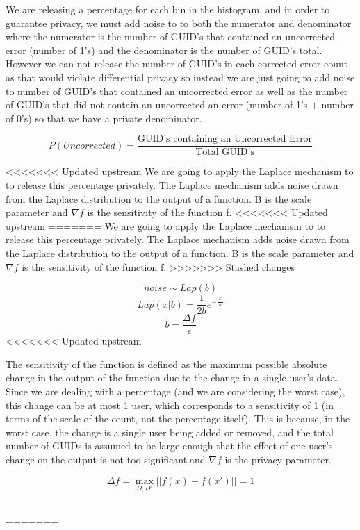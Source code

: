 \documentclass[12pt,letterpaper]{article}
\begin{document}
\begin{table}[h]
We are releasing a percentage for each bin in the histogram, and in order to guarantee privacy, we must add noise to to both the numerator and denominator where the numerator is the number of GUID's that contained an uncorrected error (number of 1's) and the denominator is the number of GUID's total. However we can not release the number of GUID's in each corrected error count as that would violate differential privacy so instead we are just going to add noise to number of GUID's that contained an uncorrected error as well as the number of GUID's that did not contain an uncorrected an error (number of 1's + number of 0's) so that we have a private denominator. 

\[
P(Uncorrected) = \frac{\text{GUID's containing an Uncorrected Error}}{\text{Total GUID's}}
\]

<<<<<<< Updated upstream
We are going to apply the Laplace mechanism to to release this percentage privately. The Laplace mechanism adds noise drawn from the Laplace distribution to the output of a function. B is the scale parameter and $\nabla f$ is the sensitivity of the function f. 
<<<<<<< Updated upstream
=======
We are going to apply the Laplace mechanism to to release this percentage privately. The Laplace mechanism adds noise drawn from the Laplace distribution to the output of a function. B is the scale parameter and $\nabla f$ is the sensitivity of the function f. \cite{DworkRoth}
>>>>>>> Stashed changes


$$noise \sim Lap(b) $$
$$Lap(x|b) = \frac{1}{2b}e^{-\frac{|x|}{b}}$$
$$b = \frac{\Delta f}{\epsilon}$$
<<<<<<< Updated upstream

The sensitivity of the function is defined as the maximum possible absolute change in the output of the function due to the change in a single user's data. Since we are dealing with a percentage (and we are considering the worst case), this change can be at most 1 user, which corresponds to a sensitivity of 1 (in terms of the scale of the count, not the percentage itself). This is because, in the worst case, the change is a single user being added or removed, and the total number of GUIDs is assumed to be large enough that the effect of one user's change on the output is not too significant.and $\nabla f$ is the privacy parameter. 
\begin{center}
$$\Delta f = \max_{D, D'} ||f(x) - f(x')|| = 1$$ \\
\end{center}
=======


\end{table}
\end{document}
